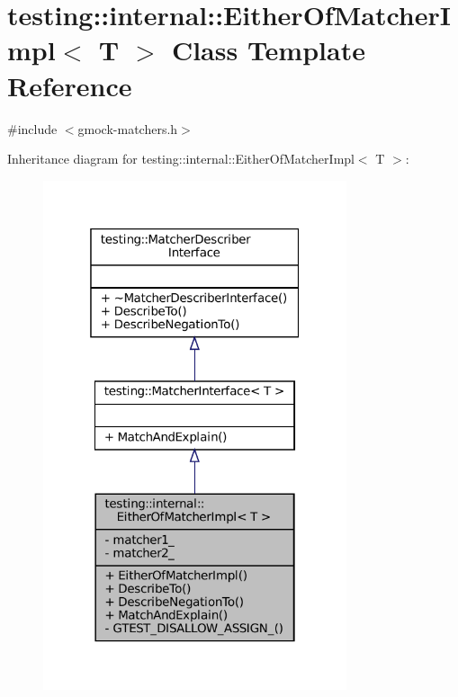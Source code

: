 \hypertarget{classtesting_1_1internal_1_1EitherOfMatcherImpl}{}\section{testing\+:\+:internal\+:\+:Either\+Of\+Matcher\+Impl$<$ T $>$ Class Template Reference}
\label{classtesting_1_1internal_1_1EitherOfMatcherImpl}


{\ttfamily \#include $<$gmock-\/matchers.\+h$>$}



Inheritance diagram for testing\+:\+:internal\+:\+:Either\+Of\+Matcher\+Impl$<$ T $>$\+:
\nopagebreak
\begin{figure}[H]
\begin{center}
\leavevmode
\includegraphics[width=253pt]{classtesting_1_1internal_1_1EitherOfMatcherImpl__inherit__graph}
\end{center}
\end{figure}


